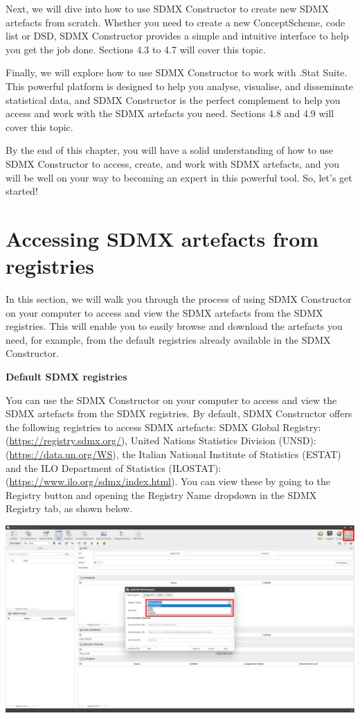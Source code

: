 \documentclass[
]{book}
\begin{document}
Next, we will dive into how to use SDMX Constructor to create new SDMX artefacts from scratch. Whether you need to create a new ConceptScheme, code list or DSD, SDMX Constructor provides a simple and intuitive interface to help you get the job done. Sections 4.3 to 4.7 will cover this topic.

Finally, we will explore how to use SDMX Constructor to work with .Stat Suite. This powerful platform is designed to help you analyse, visualise, and disseminate statistical data, and SDMX Constructor is the perfect complement to help you access and work with the SDMX artefacts you need. Sections 4.8 and 4.9 will cover this topic.

By the end of this chapter, you will have a solid understanding of how to use SDMX Constructor to access, create, and work with SDMX artefacts, and you will be well on your way to becoming an expert in this powerful tool. So, let's get started!

\hypertarget{accessing-sdmx}{%
\section{Accessing SDMX artefacts from registries}\label{accessing-sdmx}}

In this section, we will walk you through the process of using SDMX Constructor on your computer to access and view the SDMX artefacts from the SDMX registries. This will enable you to easily browse and download the artefacts you need, for example, from the default registries already available in the SDMX Constructor.

\textbf{Default SDMX registries}

You can use the SDMX Constructor on your computer to access and view the SDMX artefacts from the SDMX registries. By default, SDMX Constructor offers the following registries to access SDMX artefacts: SDMX Global Registry: (\url{https://registry.sdmx.org/}), United Nations Statistics Division (UNSD): (\url{https://data.un.org/WS}), the Italian National Institute of Statistics (ESTAT) and the ILO Department of Statistics (ILOSTAT): (\url{https://www.ilo.org/sdmx/index.html}). You can view these by going to the Registry button and opening the Registry Name dropdown in the SDMX Registry tab, as shown below.

\begin{center}\includegraphics[width=1\linewidth]{./images/image044} \end{center}
\end{document}
